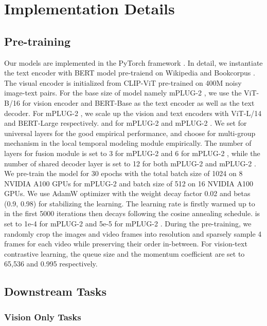 \documentclass{article}
\theoremstyle{plain}
\theoremstyle{definition}
\theoremstyle{remark}
\newcommand{\modelname}{mPLUG-2 }
\newcommand{\modelnamebase}{mPLUG-2 }
\begin{document}
\section{Implementation Details}

\subsection{Pre-training}
Our models are implemented in the PyTorch framework \citep{Paszke2019PyTorchAI}. In detail, we instantiate the text encoder with BERT \citep{devlin2018bert} model pre-traiend on Wikipedia and Bookcorpus \citep{Zhu2015BookCorpus}. The visual encoder is initialized from CLIP-ViT \citep{radford2021learning} pre-trained on 400M noisy image-text pairs. For the base size of model namely \modelnamebase, we use the ViT-B/16 for vision encoder and BERT-Base \citep{devlin2018bert} as the text encoder as well as the text decoder. For \modelname, we scale up the vision and text encoders with ViT-L/14 \citep{dosovitskiy2020image} and BERT-Large \citep{devlin2018bert} respectively.  and  for \modelnamebase and \modelname. We set  for universal layers for the good empirical performance, and choose  for multi-group mechanism in the local temporal modeling module empirically. The number of layers for fusion module is set to 3 for \modelnamebase and 6 for \modelname, while the number of shared decoder layer is set to 12 for both \modelnamebase and \modelname. We pre-train the model for 30 epochs with the total batch size of 1024 on 8 NVIDIA A100 GPUs for \modelnamebase and batch size of 512 on 16 NVIDIA A100 GPUs. We use AdamW \citep{Loshchilov2019DecoupledWD} optimizer with the weight decay factor 0.02 and betas (0.9, 0.98) for stabilizing the learning. The learning rate is firstly warmed up to  in the first 5000 iterations then decays following the cosine annealing schedule.  is set to 1e-4 for \modelnamebase and 5e-5 for \modelname. During the pre-training, we randomly crop the images and video frames into  resolution and sparsely sample 4 frames for each video while preserving their order in-between. For vision-text contrastive learning, the queue size and the momentum coefficient are set to 65,536 and 0.995 respectively. 


\subsection{Downstream Tasks}
\subsubsection{Vision Only Tasks}
\end{document}
